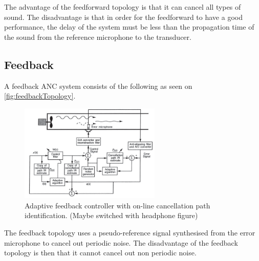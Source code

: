 The advantage of the feedforward topology is that it can cancel all types of sound. The disadvantage is that in order for the feedforward to have a good performance, the delay of the system must be less than the propagation time of the sound from the reference microphone to the transducer.    




\subsection*{Feedback}
A feedback ANC system consists of the following as seen on \autoref{fig:feedbackTopology}.
\begin{figure}[H]
	\centering
	\includegraphics[width=0.6\textwidth]{figures/BasicSystem/feedback}
	\caption{Adaptive feedback controller with on-line cancellation path identification. (Maybe switched with headphone figure)}
	\label{fig:feedbackTopology}
\end{figure}

The feedback topology uses a pseudo-reference signal synthesised from the error microphone to cancel out periodic noise. The disadvantage of the feedback topology is then that it cannot cancel out non periodic noise.    




